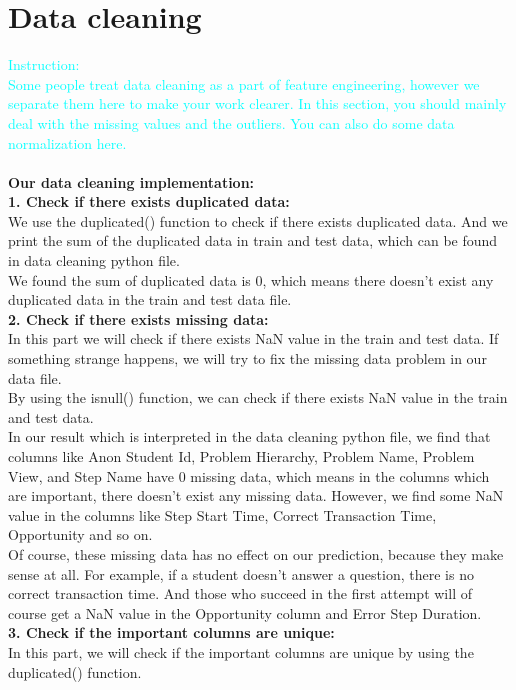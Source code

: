 \documentclass{article}
\begin{document}
\section{Data cleaning}
\textcolor{cyan}{Instruction: \\
  Some people treat data cleaning as a part of feature engineering, however we separate them here to make your work clearer. In this section, you should mainly deal with the missing values and the outliers. You can also do some data normalization here.}\\\\
\textbf{Our data cleaning implementation:}\\
\textbf{1. Check if there exists duplicated data:} \\
We use the duplicated() function to check if there exists duplicated data. And we print the sum of
the duplicated data in train and test data, which can be found in data cleaning python file. \\
We found the sum of duplicated data is 0, which means there doesn't exist any duplicated data in the train and test data file.\\
\textbf{2. Check if there exists missing data:} \\
In this part we will check if there exists NaN value in the train and test data. If something strange happens,
we will try to fix the missing data problem in our data file. \\
By using the isnull() function, we can check if there exists NaN value in the train and test data. \\
In our result which is interpreted in the data cleaning python file, we find that columns like Anon Student Id, Problem Hierarchy, Problem Name, Problem View, and Step Name have 0 missing data,
which means in the columns which are important, there doesn't exist any missing data. However, we find some NaN value in the columns
like Step Start Time, Correct Transaction Time, Opportunity and so on. \\
Of course, these missing data has no effect on our prediction, because they make sense at all. For example,
if a student doesn't answer a question, there is no correct transaction time. And those who succeed in the first
attempt will of course get a NaN value in the Opportunity column and Error Step Duration. \\
\textbf{3. Check if the important columns are unique:} \\
In this part, we will check if the important columns are unique by using the duplicated() function. \\
\end{document}
